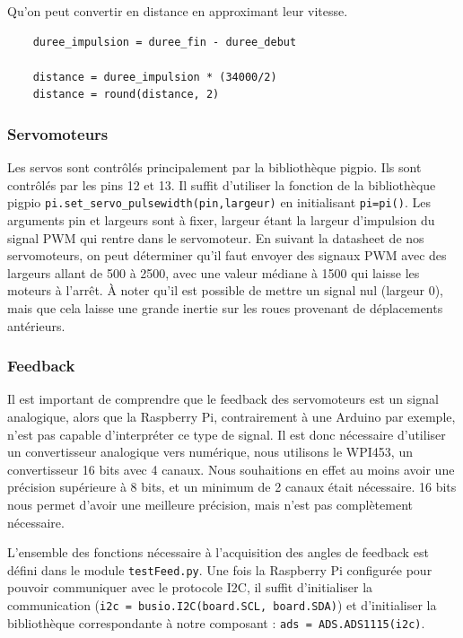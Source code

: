\documentclass[a4paper,12pt]{report}  %
\begin{document}
Qu’on peut convertir en distance en approximant leur vitesse.

\begin{lstlisting}
	duree_impulsion = duree_fin - duree_debut
	
	distance = duree_impulsion * (34000/2)
	distance = round(distance, 2)
\end{lstlisting}

\subsubsection{Servomoteurs}

Les servos sont contrôlés principalement par la bibliothèque pigpio.  
Ils sont contrôlés par les pins 12 et 13. Il suffit d’utiliser la fonction de la bibliothèque pigpio \texttt{pi.set\_servo\_pulsewidth(pin,largeur)} en initialisant \texttt{pi=pi()}. Les arguments pin et largeurs sont à fixer, largeur étant la largeur d’impulsion du signal PWM qui rentre dans le servomoteur. En suivant la datasheet de nos servomoteurs, on peut déterminer qu’il faut envoyer des signaux PWM avec des largeurs allant de 500 à 2500, avec une valeur médiane à 1500 qui laisse les moteurs à l’arrêt.
À noter qu’il est possible de mettre un signal nul (largeur 0), mais que cela laisse une grande inertie sur les roues provenant de déplacements antérieurs. 

\subsubsection{Feedback}

Il est important de comprendre que le feedback des servomoteurs est un signal analogique, alors que la Raspberry Pi, contrairement à une Arduino par exemple, n’est pas capable d’interpréter ce type de signal. Il est donc nécessaire d’utiliser un convertisseur analogique vers numérique, nous utilisons le WPI453, un convertisseur 16 bits avec 4 canaux. Nous souhaitions en effet au moins avoir une précision supérieure à 8 bits, et un minimum de 2 canaux était nécessaire. 16 bits nous permet d’avoir une meilleure précision, mais n’est pas complètement nécessaire.

L’ensemble des fonctions nécessaire à l’acquisition des angles de feedback est défini dans le module \texttt{testFeed.py}. Une fois la Raspberry Pi configurée pour pouvoir communiquer avec le protocole I2C, il suffit d’initialiser la communication (\texttt{i2c = busio.I2C(board.SCL, board.SDA)}) et d’initialiser la bibliothèque correspondante à notre composant : \texttt{ads = ADS.ADS1115(i2c)}.
\end{document}

